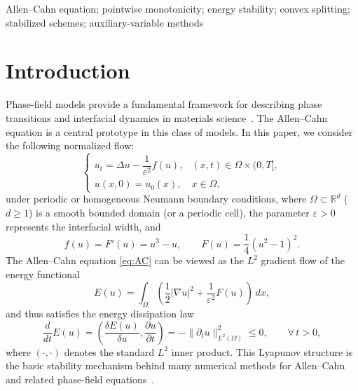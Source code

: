 \documentclass[final, 3p, times]{elsarticle}%
\newcommand{\eps}{\varepsilon}
\begin{document}
\begin{frontmatter}
\begin{abstract}
\end{abstract}


\begin{keyword}
Allen--Cahn equation; pointwise monotonicity; energy stability; convex splitting; stabilized schemes; auxiliary-variable methods
\end{keyword}

\end{frontmatter}


\section{Introduction}

Phase-field models provide a fundamental framework for describing phase transitions and interfacial dynamics in materials science~\cite{allen1979microscopic,cahn1958free,hawkins2012numerical}. The Allen--Cahn equation is a central prototype in this class of models. In this paper, we consider the following normalized flow:
\begin{equation}
\left\{
\begin{array}{ll}
    u_t=\Delta u-\dfrac{1}{\eps^2}f(u), & (x,t)\in\Omega\times(0,T],\\[1.2ex]
    u(x,0)=u_0(x), & x\in\Omega,
\end{array}
\right.
\label{eq:AC}
\end{equation}
under periodic or homogeneous Neumann boundary conditions, where $\Omega\subset \mathbb{R}^d$ ($d\geqslant1$) is a smooth bounded domain (or a periodic cell), the parameter $\varepsilon>0$ represents the interfacial width, and
\[
    f(u)=F'(u)=u^3-u,\qquad F(u)=\frac14(u^2-1)^2.
\]
The Allen--Cahn equation \eqref{eq:AC} can be viewed as the $L^2$ gradient flow of the energy functional
\begin{equation}
    E(u)=\int_{\Omega}\left(\frac12|\nabla u|^2+\frac1{\eps^2}F(u)\right)\,dx,
    \label{eq:AC-energy}
\end{equation}
and thus satisfies the energy dissipation law
\begin{equation}
    \frac{d}{dt}E(u)=
    \left(
    \frac{\delta E(u)}{\delta u},
    \frac{\partial u}{\partial t}
    \right)=
    -\|\partial_t u\|_{L^2(\Omega)}^2
    \le 0,
    \qquad \forall\, t>0,
    \label{eq:energy-dis}
\end{equation}
where $(\cdot,\cdot)$ denotes the standard $L^2$ inner product.
This Lyapunov structure is the basic stability mechanism behind many numerical methods for Allen--Cahn and related phase-field equations~\cite{du1991numerical,elliott1993global,feng2003numerical,zhang2009numerical,feng2015analysis}.
\end{document}
